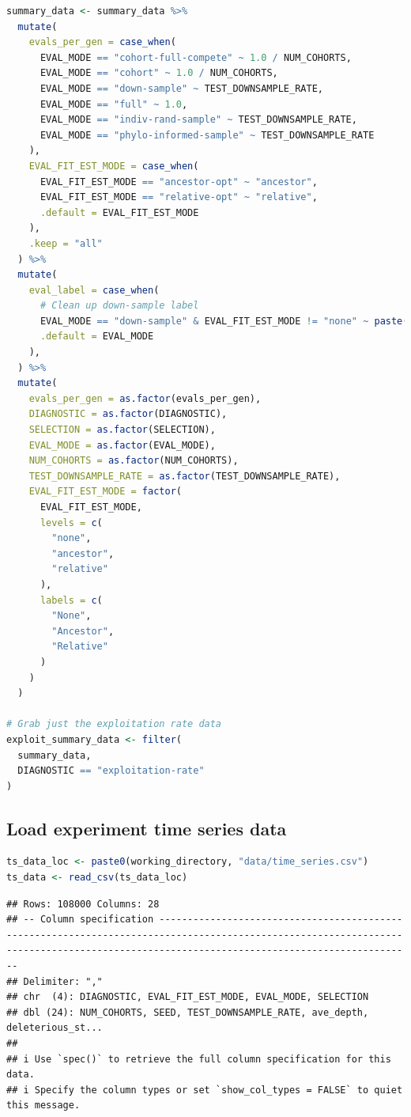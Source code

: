 \documentclass[
]{book}
\begin{document}
\begin{lstlisting}[language=R]
summary_data <- summary_data %>%
  mutate(
    evals_per_gen = case_when(
      EVAL_MODE == "cohort-full-compete" ~ 1.0 / NUM_COHORTS,
      EVAL_MODE == "cohort" ~ 1.0 / NUM_COHORTS,
      EVAL_MODE == "down-sample" ~ TEST_DOWNSAMPLE_RATE,
      EVAL_MODE == "full" ~ 1.0,
      EVAL_MODE == "indiv-rand-sample" ~ TEST_DOWNSAMPLE_RATE,
      EVAL_MODE == "phylo-informed-sample" ~ TEST_DOWNSAMPLE_RATE
    ),
    EVAL_FIT_EST_MODE = case_when(
      EVAL_FIT_EST_MODE == "ancestor-opt" ~ "ancestor",
      EVAL_FIT_EST_MODE == "relative-opt" ~ "relative",
      .default = EVAL_FIT_EST_MODE
    ),
    .keep = "all"
  ) %>%
  mutate(
    eval_label = case_when(
      # Clean up down-sample label
      EVAL_MODE == "down-sample" & EVAL_FIT_EST_MODE != "none" ~ paste("down-sample", EVAL_FIT_EST_MODE, sep="-"),
      .default = EVAL_MODE
    ),
  ) %>%
  mutate(
    evals_per_gen = as.factor(evals_per_gen),
    DIAGNOSTIC = as.factor(DIAGNOSTIC),
    SELECTION = as.factor(SELECTION),
    EVAL_MODE = as.factor(EVAL_MODE),
    NUM_COHORTS = as.factor(NUM_COHORTS),
    TEST_DOWNSAMPLE_RATE = as.factor(TEST_DOWNSAMPLE_RATE),
    EVAL_FIT_EST_MODE = factor(
      EVAL_FIT_EST_MODE,
      levels = c(
        "none",
        "ancestor",
        "relative"
      ),
      labels = c(
        "None",
        "Ancestor",
        "Relative"
      )
    )
  )

# Grab just the exploitation rate data
exploit_summary_data <- filter(
  summary_data,
  DIAGNOSTIC == "exploitation-rate"
)
\end{lstlisting}

\hypertarget{load-experiment-time-series-data}{%
\subsection{Load experiment time series data}\label{load-experiment-time-series-data}}

\begin{lstlisting}[language=R]
ts_data_loc <- paste0(working_directory, "data/time_series.csv")
ts_data <- read_csv(ts_data_loc)
\end{lstlisting}

\begin{lstlisting}
## Rows: 108000 Columns: 28
## -- Column specification -----------------------------------------------------------------------------------------------------------------------------------------------------------------------------------------
## Delimiter: ","
## chr  (4): DIAGNOSTIC, EVAL_FIT_EST_MODE, EVAL_MODE, SELECTION
## dbl (24): NUM_COHORTS, SEED, TEST_DOWNSAMPLE_RATE, ave_depth, deleterious_st...
## 
## i Use `spec()` to retrieve the full column specification for this data.
## i Specify the column types or set `show_col_types = FALSE` to quiet this message.
\end{lstlisting}
\end{document}
